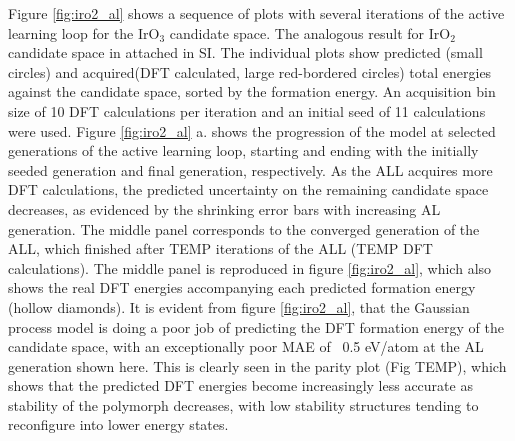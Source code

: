 %
Figure \ref{fig:iro2_al} shows a sequence of  plots with several iterations of the active learning loop for the IrO$_3$ candidate space. The analogous result for IrO$_2$ candidate space in attached in SI.  The individual plots show predicted (small circles) and acquired(DFT calculated, large red-bordered circles) total energies against the candidate space, sorted by the formation energy.  An acquisition bin size of 10 DFT calculations per iteration and an initial seed of 11 calculations were used.
%
Figure \ref{fig:iro2_al} a. shows the progression of the model at selected generations of the active learning loop, starting and ending with the initially seeded generation and final generation, respectively.
%
As the ALL acquires more DFT calculations, the predicted uncertainty on the remaining candidate space decreases,
as evidenced by the shrinking error bars with increasing AL generation.
%
The middle panel corresponds to the converged generation of the ALL, which finished after TEMP iterations of the ALL (TEMP DFT calculations).
%
The middle panel is reproduced in figure \ref{fig:iro2_al}, which also shows the real DFT energies accompanying each predicted formation energy (hollow diamonds).
%
It is evident from figure \ref{fig:iro2_al}, that the Gaussian process model is doing a poor job of predicting the DFT formation energy of the candidate space, with an exceptionally poor MAE of ~0.5 eV/atom at the AL generation shown here.
%
This is clearly seen in the parity plot (Fig TEMP), which shows that the predicted DFT energies become increasingly less accurate as stability of the polymorph decreases, with low stability structures tending to reconfigure into lower energy states.
